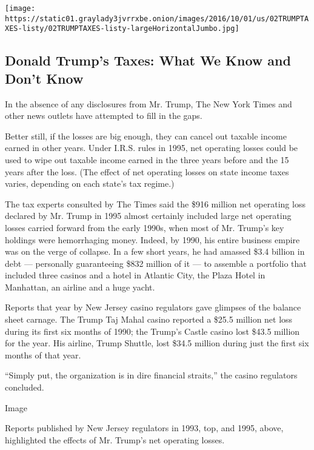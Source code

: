 \href{https://www.nytimes3xbfgragh.onion/interactive/2016/us/politics/donald-trump-taxes-explained.html}{}

\texttt{[image: https://static01.graylady3jvrrxbe.onion/images/2016/10/01/us/02TRUMPTAXES-listy/02TRUMPTAXES-listy-largeHorizontalJumbo.jpg]}

\hypertarget{donald-trumps-taxes-what-we-know-and-dont-know}{%
\subsection{Donald Trump's Taxes: What We Know and Don't
Know}\label{donald-trumps-taxes-what-we-know-and-dont-know}}

In the absence of any disclosures from Mr. Trump, The New York Times and
other news outlets have attempted to fill in the gaps.

Better still, if the losses are big enough, they can cancel out taxable
income earned in other years. Under I.R.S. rules in 1995, net operating
losses could be used to wipe out taxable income earned in the three
years before and the 15 years after the loss. (The effect of net
operating losses on state income taxes varies, depending on each state's
tax regime.)

The tax experts consulted by The Times said the \$916 million net
operating loss declared by Mr. Trump in 1995 almost certainly included
large net operating losses carried forward from the early 1990s, when
most of Mr. Trump's key holdings were hemorrhaging money. Indeed, by
1990, his entire business empire was on the verge of collapse. In a few
short years, he had amassed \$3.4 billion in debt --- personally
guaranteeing \$832 million of it --- to assemble a portfolio that
included three casinos and a hotel in Atlantic City, the Plaza Hotel in
Manhattan, an airline and a huge yacht.

Reports that year by New Jersey casino regulators gave glimpses of the
balance sheet carnage. The Trump Taj Mahal casino reported a \$25.5
million net loss during its first six months of 1990; the Trump's Castle
casino lost \$43.5 million for the year. His airline, Trump Shuttle,
lost \$34.5 million during just the first six months of that year.

``Simply put, the organization is in dire financial straits,'' the
casino regulators concluded.

Image

Reports published by New Jersey regulators in 1993, top, and 1995,
above, highlighted the effects of Mr. Trump's net operating losses.

